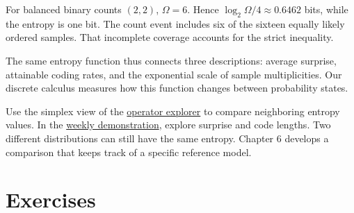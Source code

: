 \documentclass[11pt,oneside,openany]{book}
\theoremstyle{definition}
\theoremstyle{remark}
\numberwithin{equation}{chapter}
\begin{document}
For balanced binary counts \((2,2)\), \(\Omega=6\). Hence \(\log_2\Omega/4\approx0.6462\) bits, while the entropy is one bit. The count event includes six of the sixteen equally likely ordered samples. That incomplete coverage accounts for the strict inequality.

The same entropy function thus connects three descriptions: average surprise, attainable coding rates, and the exponential scale of sample multiplicities. Our discrete calculus measures how this function changes between probability states.

Use the simplex view of the \href{https://bobovski66.github.io/IntroDiscreteInfoGeom/demos/operator-explorer.html}{operator explorer} to compare neighboring entropy values. In the \href{https://bobovski66.github.io/IntroDiscreteInfoGeom/demos/week05.html}{weekly demonstration}, explore surprise and code lengths. Two different distributions can still have the same entropy. Chapter 6 develops a comparison that keeps track of a specific reference model.

\section{Exercises}\label{ch05-exercises}
\end{document}
